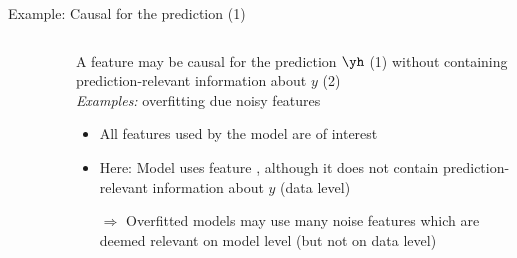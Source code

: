 \begin{frame}[c]{Example: Causal for the prediction (1)}
\begin{columns}[c]
\begin{column}{0.5\textwidth}
\begin{figure}
\end{figure} 
  \end{column}
  \begin{column}{0.5\textwidth}
  A feature may be causal for the prediction $\yh$ (1) without containing prediction-relevant information about $y$ (2)\\ 
  \textit{Examples:} overfitting due noisy features
  \lz\pause
    \begin{itemize}
      \item All features used by the model are of interest
      \item Here: Model uses feature , although it does not contain prediction-relevant information about $y$ (data level)
      \item[$\Rightarrow$] Overfitted models may use many noise features which are deemed relevant on model level (but not on data level)
  \end{itemize}
  \end{column}
\end{columns}

\end{frame}

